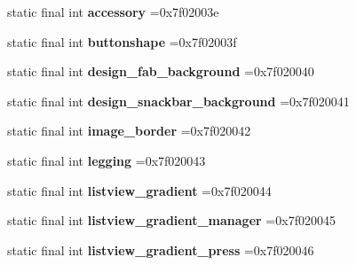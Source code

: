 \begin{DoxyCompactItemize}
\item 
\hypertarget{classcheck_1_1test_1_1_r_1_1drawable_a550d610b9b776111470621daeac9babe}{}static final int {\bfseries accessory} =0x7f02003e\label{classcheck_1_1test_1_1_r_1_1drawable_a550d610b9b776111470621daeac9babe}

\item 
\hypertarget{classcheck_1_1test_1_1_r_1_1drawable_a018a646301cfb16caeef356837abeaba}{}static final int {\bfseries buttonshape} =0x7f02003f\label{classcheck_1_1test_1_1_r_1_1drawable_a018a646301cfb16caeef356837abeaba}

\item 
\hypertarget{classcheck_1_1test_1_1_r_1_1drawable_aac5ada358dba3c6e6181e9a79a8b4915}{}static final int {\bfseries design\+\_\+fab\+\_\+background} =0x7f020040\label{classcheck_1_1test_1_1_r_1_1drawable_aac5ada358dba3c6e6181e9a79a8b4915}

\item 
\hypertarget{classcheck_1_1test_1_1_r_1_1drawable_af0626b9866df703c5e70a320766daaee}{}static final int {\bfseries design\+\_\+snackbar\+\_\+background} =0x7f020041\label{classcheck_1_1test_1_1_r_1_1drawable_af0626b9866df703c5e70a320766daaee}

\item 
\hypertarget{classcheck_1_1test_1_1_r_1_1drawable_a9fc61990c64f0cf7eaaff5c80036ae12}{}static final int {\bfseries image\+\_\+border} =0x7f020042\label{classcheck_1_1test_1_1_r_1_1drawable_a9fc61990c64f0cf7eaaff5c80036ae12}

\item 
\hypertarget{classcheck_1_1test_1_1_r_1_1drawable_adaff0d97a51b54278f398e6011b7e274}{}static final int {\bfseries legging} =0x7f020043\label{classcheck_1_1test_1_1_r_1_1drawable_adaff0d97a51b54278f398e6011b7e274}

\item 
\hypertarget{classcheck_1_1test_1_1_r_1_1drawable_a8097ad54b39f2ad11fbf3f4c2bde085b}{}static final int {\bfseries listview\+\_\+gradient} =0x7f020044\label{classcheck_1_1test_1_1_r_1_1drawable_a8097ad54b39f2ad11fbf3f4c2bde085b}

\item 
\hypertarget{classcheck_1_1test_1_1_r_1_1drawable_a31227db72fc405f93da82c3bfdfedb31}{}static final int {\bfseries listview\+\_\+gradient\+\_\+manager} =0x7f020045\label{classcheck_1_1test_1_1_r_1_1drawable_a31227db72fc405f93da82c3bfdfedb31}

\item 
\hypertarget{classcheck_1_1test_1_1_r_1_1drawable_a43f3d88fcdf24e51b9d8e637e1e964d4}{}static final int {\bfseries listview\+\_\+gradient\+\_\+press} =0x7f020046\label{classcheck_1_1test_1_1_r_1_1drawable_a43f3d88fcdf24e51b9d8e637e1e964d4}


\end{DoxyCompactItemize}
